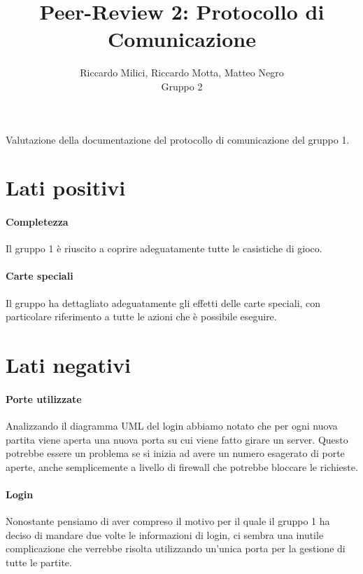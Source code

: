 \documentclass[a4paper]{article}
\title{Peer-Review 2: Protocollo di Comunicazione}
\author{Riccardo Milici, Riccardo Motta, Matteo Negro\\Gruppo 2}
\begin{document}
	
	\maketitle
	
	Valutazione della documentazione del protocollo di comunicazione del gruppo 1.
	
	\section{Lati positivi}
	
	
	\paragraph{Completezza} Il gruppo 1 è riuscito a coprire adeguatamente tutte le casistiche di gioco.
	
	\paragraph{Carte speciali} Il gruppo ha dettagliato adeguatamente gli effetti delle carte speciali, con particolare riferimento a tutte le azioni che è possibile eseguire.
	
	\section{Lati negativi}
	
	
	\paragraph{Porte utilizzate} Analizzando il diagramma UML del login abbiamo notato che per ogni nuova partita viene aperta una nuova porta su cui viene fatto girare un server. Questo potrebbe essere un problema se si inizia ad avere un numero esagerato di porte aperte, anche semplicemente a livello di firewall che potrebbe bloccare le richieste.
	
	\paragraph{Login} Nonostante pensiamo di aver compreso il motivo per il quale il gruppo 1 ha deciso di mandare due volte le informazioni di login, ci sembra una inutile complicazione che verrebbe risolta utilizzando un'unica porta per la gestione di tutte le partite.
	
\end{document}
